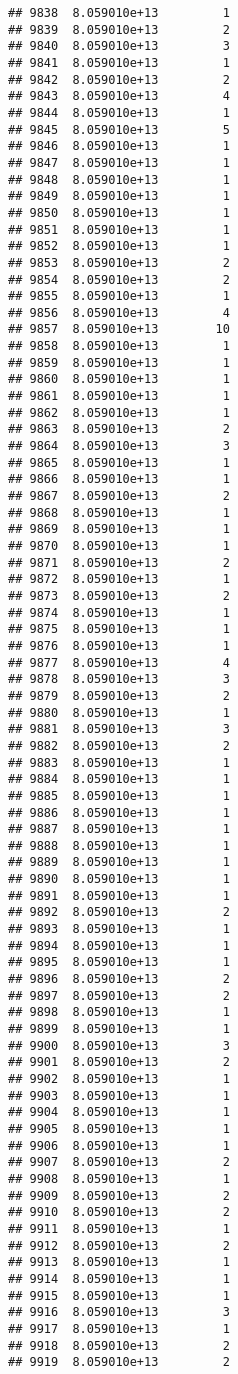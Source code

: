 \documentclass[
]{article}
\begin{document}
\begin{verbatim}
## 9838  8.059010e+13         1
## 9839  8.059010e+13         2
## 9840  8.059010e+13         3
## 9841  8.059010e+13         1
## 9842  8.059010e+13         2
## 9843  8.059010e+13         4
## 9844  8.059010e+13         1
## 9845  8.059010e+13         5
## 9846  8.059010e+13         1
## 9847  8.059010e+13         1
## 9848  8.059010e+13         1
## 9849  8.059010e+13         1
## 9850  8.059010e+13         1
## 9851  8.059010e+13         1
## 9852  8.059010e+13         1
## 9853  8.059010e+13         2
## 9854  8.059010e+13         2
## 9855  8.059010e+13         1
## 9856  8.059010e+13         4
## 9857  8.059010e+13        10
## 9858  8.059010e+13         1
## 9859  8.059010e+13         1
## 9860  8.059010e+13         1
## 9861  8.059010e+13         1
## 9862  8.059010e+13         1
## 9863  8.059010e+13         2
## 9864  8.059010e+13         3
## 9865  8.059010e+13         1
## 9866  8.059010e+13         1
## 9867  8.059010e+13         2
## 9868  8.059010e+13         1
## 9869  8.059010e+13         1
## 9870  8.059010e+13         1
## 9871  8.059010e+13         2
## 9872  8.059010e+13         1
## 9873  8.059010e+13         2
## 9874  8.059010e+13         1
## 9875  8.059010e+13         1
## 9876  8.059010e+13         1
## 9877  8.059010e+13         4
## 9878  8.059010e+13         3
## 9879  8.059010e+13         2
## 9880  8.059010e+13         1
## 9881  8.059010e+13         3
## 9882  8.059010e+13         2
## 9883  8.059010e+13         1
## 9884  8.059010e+13         1
## 9885  8.059010e+13         1
## 9886  8.059010e+13         1
## 9887  8.059010e+13         1
## 9888  8.059010e+13         1
## 9889  8.059010e+13         1
## 9890  8.059010e+13         1
## 9891  8.059010e+13         1
## 9892  8.059010e+13         2
## 9893  8.059010e+13         1
## 9894  8.059010e+13         1
## 9895  8.059010e+13         1
## 9896  8.059010e+13         2
## 9897  8.059010e+13         2
## 9898  8.059010e+13         1
## 9899  8.059010e+13         1
## 9900  8.059010e+13         3
## 9901  8.059010e+13         2
## 9902  8.059010e+13         1
## 9903  8.059010e+13         1
## 9904  8.059010e+13         1
## 9905  8.059010e+13         1
## 9906  8.059010e+13         1
## 9907  8.059010e+13         2
## 9908  8.059010e+13         1
## 9909  8.059010e+13         2
## 9910  8.059010e+13         2
## 9911  8.059010e+13         1
## 9912  8.059010e+13         2
## 9913  8.059010e+13         1
## 9914  8.059010e+13         1
## 9915  8.059010e+13         1
## 9916  8.059010e+13         3
## 9917  8.059010e+13         1
## 9918  8.059010e+13         2
## 9919  8.059010e+13         2

\end{verbatim}
\end{document}
